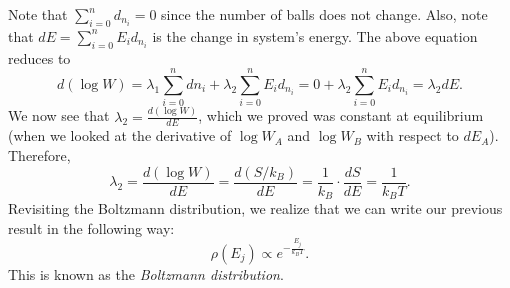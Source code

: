 \documentclass{article}
\begin{document}
Note that $\sum_{i=0}^n d_{n_i}=0$ since the number of balls does not change. Also, note that $dE=\sum_{i=0}^n E_i d_{n_i}$ is the change in system's energy. The above equation reduces to 
\[d(\log W) =\lambda_1 \sum_{i=0}^n dn_i + \lambda_2 \sum_{i=0}^n E_i d_{n_i}=0+\lambda_2 \sum_{i=0}^n E_i d_{n_i}=\lambda_2 dE.\]
We now see that $\lambda_2 = \frac{d(\log W)}{dE}$, which we proved was constant at equilibrium (when we looked at the derivative of $\log W_A$ and $\log W_B$ with respect to $dE_A$). Therefore, 
\[\lambda_2 = \frac{d(\log W)}{dE} = \frac{d(S/k_B)}{dE}=\frac{1}{k_B} \cdot \frac{dS}{dE} = \frac{1}{k_B T}.\]
Revisiting the Boltzmann distribution, we realize that we can write our previous result in the following way:
\[\rho(E_j) \propto e^{-\frac{E_j}{k_B T}}.\]
This is known as the \textit{Boltzmann distribution}. 
\end{document}
